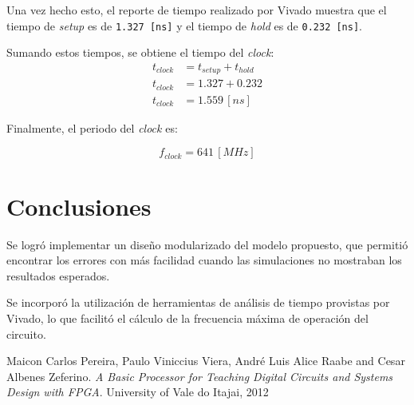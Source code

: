\documentclass[12pt,a4paper]{article}
\begin{document}
Una vez hecho esto, el reporte de tiempo realizado por Vivado muestra 
que el tiempo de \emph{setup} es de \verb|1.327 [ns]| y el tiempo de \emph{hold} es de \verb|0.232 [ns]|.

Sumando estos tiempos, se obtiene el tiempo del \emph{clock}:
\begin{align*}
	t_{clock} &= t_{setup} + t_{hold} \\
	t_{clock} &= 1.327 + 0.232 \\
	t_{clock} &= 1.559\,[ns]
\end{align*}

Finalmente, el periodo del \emph{clock} es:

\begin{equation}
f_{clock} = 641\,[MHz]
\end{equation}

\section{Conclusiones}
\label{concu}

Se logró implementar un diseño modularizado del modelo propuesto, que permitió encontrar los errores con más facilidad cuando las simulaciones no mostraban los resultados esperados.

Se incorporó la utilización de herramientas de análisis de tiempo provistas por Vivado, lo que facilitó el cálculo de la frecuencia máxima de operación del circuito.

\begin{thebibliography}{9}

Maicon Carlos Pereira, Paulo Viniccius Viera, André Luis Alice Raabe and Cesar Albenes Zeferino. \emph{A Basic Processor for Teaching
Digital Circuits and Systems Design with FPGA}. University of Vale do Itajai, 2012 \\

\end{thebibliography}
\end{document}
